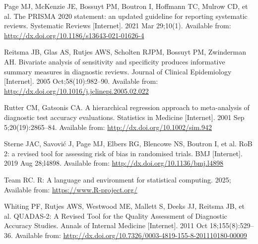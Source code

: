 \documentclass[
  10pt,
  a4paper,
  DIV=11,
  numbers=noendperiod]{scrreprt}
\newlength{\cslhangindent}
\newenvironment{CSLReferences}[2] %
 {\begin{list}{}{%
  \setlength{\itemindent}{0pt}
  \setlength{\leftmargin}{0pt}
  \setlength{\parsep}{0pt}
  \ifodd #1
   \setlength{\leftmargin}{\cslhangindent}
   \setlength{\itemindent}{-1\cslhangindent}
  \fi
  \setlength{\itemsep}{#2\baselineskip}}}
 {\end{list}}
\begin{document}
\begin{CSLReferences}{1}{1}
Page MJ, McKenzie JE, Bossuyt PM, Boutron I, Hoffmann TC, Mulrow CD, et
al. The PRISMA 2020 statement: an updated guideline for reporting
systematic reviews. Systematic Reviews {[}Internet{]}. 2021 Mar
29;10(1). Available from:
\url{http://dx.doi.org/10.1186/s13643-021-01626-4}

Reitsma JB, Glas AS, Rutjes AWS, Scholten RJPM, Bossuyt PM, Zwinderman
AH. Bivariate analysis of sensitivity and specificity produces
informative summary measures in diagnostic reviews. Journal of Clinical
Epidemiology {[}Internet{]}. 2005 Oct;58(10):982--90. Available from:
\url{http://dx.doi.org/10.1016/j.jclinepi.2005.02.022}

Rutter CM, Gatsonis CA. A hierarchical regression approach to
meta{-}analysis of diagnostic test accuracy evaluations. Statistics in
Medicine {[}Internet{]}. 2001 Sep 5;20(19):2865--84. Available from:
\url{http://dx.doi.org/10.1002/sim.942}

Sterne JAC, Savović J, Page MJ, Elbers RG, Blencowe NS, Boutron I, et
al. RoB 2: a revised tool for assessing risk of bias in randomised
trials. BMJ {[}Internet{]}. 2019 Aug 28;l4898. Available from:
\url{http://dx.doi.org/10.1136/bmj.l4898}

Team RC. R: A language and environment for statistical computing. 2025;
Available from: \url{https://www.R-project.org/}

Whiting PF, Rutjes AWS, Westwood ME, Mallett S, Deeks JJ, Reitsma JB, et
al. QUADAS-2: A Revised Tool for the Quality Assessment of Diagnostic
Accuracy Studies. Annals of Internal Medicine {[}Internet{]}. 2011 Oct
18;155(8):529--36. Available from:
\url{http://dx.doi.org/10.7326/0003-4819-155-8-201110180-00009}

\end{CSLReferences}
\end{document}
